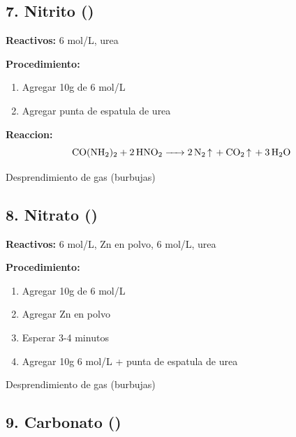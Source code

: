 \documentclass[11pt,a4paper]{article}
\begin{document}
\subsection{7. Nitrito ()}

\textbf{Reactivos:}  6 mol/L, urea 

\textbf{Procedimiento:}
\begin{enumerate}[leftmargin=*]
    \item Agregar 10g de  6 mol/L
    \item Agregar punta de espatula de urea
\end{enumerate}

\begin{reaccionbox}
\textbf{Reaccion:}
\begin{equation*}
\ce{CO(NH2)2 + 2HNO2 -> 2N2 ^ + CO2 ^ + 3H2O}
\end{equation*}
\end{reaccionbox}

\begin{resultado}
Desprendimiento de gas  (burbujas)
\end{resultado}

\subsection{8. Nitrato ()}

\textbf{Reactivos:}  6 mol/L, Zn en polvo,  6 mol/L, urea

\textbf{Procedimiento:}
\begin{enumerate}[leftmargin=*]
    \item Agregar 10g de  6 mol/L
    \item Agregar Zn en polvo
    \item Esperar 3-4 minutos
    \item Agregar 10g  6 mol/L + punta de espatula de urea
\end{enumerate}

\begin{resultado}
Desprendimiento de gas  (burbujas)
\end{resultado}

\subsection{9. Carbonato ()}
\end{document}
